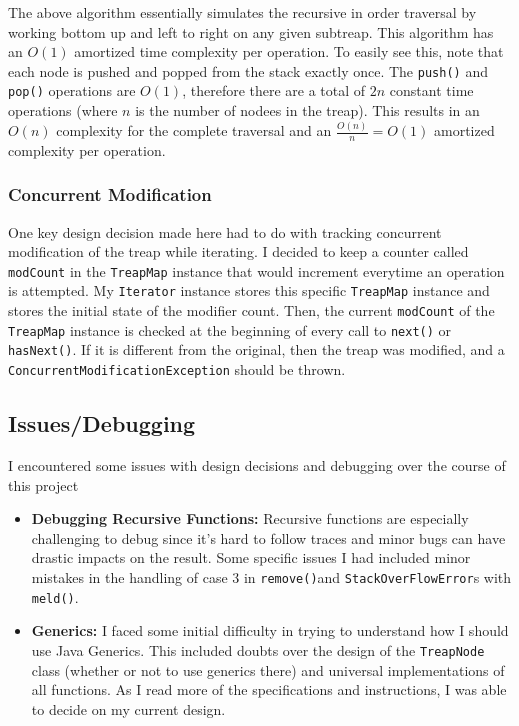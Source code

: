 \documentclass[11pt]{article}
\def\tt{\texttt}
\def\TM{\tt{TreapMap}}
\def\CME{\tt{ConcurrentModificationException}}
\def\rem{\tt{remove()}}
\def\meld{\tt{meld()}}
\def\tn{\tt{TreapNode}}
\begin{document}
The above algorithm essentially simulates the recursive in order traversal by working bottom up and left to right on any given subtreap. This algorithm has an $O(1)$ amortized time complexity per operation. To easily see this, note that each node is pushed and popped from the stack exactly once. The \tt{push()} and \tt{pop()} operations are $O(1)$, therefore there are a total of $2n$ constant time operations (where $n$ is the number of nodees in the treap). This results in an $O(n)$ complexity for the complete traversal and an $\frac{O(n)}{n} = O(1)$ amortized complexity per operation.
\subsubsection{Concurrent Modification}
One key design decision made here had to do with tracking concurrent modification of the treap while iterating. I decided to keep a counter called \tt{modCount} in the \TM{} instance that would increment everytime an operation is attempted. My \tt{Iterator} instance stores this specific \TM{} instance and stores the initial state of the modifier count. Then, the current \tt{modCount} of the \TM{} instance is checked at the beginning of every call to \tt{next()} or \tt{hasNext()}. If it is different from the original, then the treap was modified, and a \CME{} should be thrown.

\subsection{Issues/Debugging}
I encountered some issues with design decisions and debugging over the course of this project
\begin{itemize}
	\item \textbf{Debugging Recursive Functions: } Recursive functions are especially challenging to debug since it's hard to follow traces and minor bugs can have drastic impacts on the result. Some specific issues I had included minor mistakes in the handling of case 3 in \rem and \tt{StackOverFlowError}s with \meld.
	\item \textbf{Generics: } I faced some initial difficulty in trying to understand how I should use Java Generics. This included doubts over the design of the \tn{} class (whether or not to use generics there) and universal implementations of all functions. As I read more of the specifications and instructions, I was able to decide on my current design.

\end{itemize}
\end{document}
